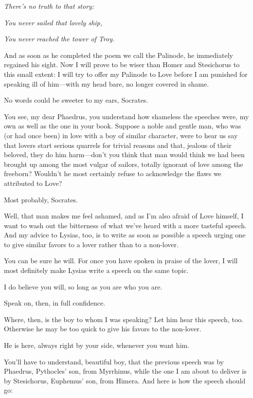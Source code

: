 {\em There's no truth to that story:}

{\em You never sailed that lovely ship,}

{\em You never reached the tower of
Troy.} \crlf
\crlf

And as soon as he completed the poem we call the Palinode, he
immediately regained his sight. Now I will prove to be wiser than Homer
and Stesichorus to this small extent: I will try to offer my Palinode to
Love before I am punished for speaking ill of him---with my head bare,
no longer covered in shame.

\sayphaedrus No words could be sweeter to my ears, Socrates.

\saysocrates You see, my dear Phaedrus, you understand how
shameless the speeches were, my own as well as the one in your book.
Suppose a noble and gentle man, who was (or had once been) in love with
a boy of similar character, were to hear us say that lovers start
serious quarrels for trivial reasons and that, jealous of their beloved,
they do him harm---don't you think that man would think we had been
brought up among the most vulgar of sailors, totally ignorant of
love among the freeborn? Wouldn't he most certainly refuse to
acknowledge the flaws we attributed to Love?

\sayphaedrus Most probably, Socrates.

\saysocrates Well, that man makes me feel ashamed, and as I'm also afraid
of Love himself, I want to wash out the bitterness of what we've heard
with a more tasteful speech. And my advice to Lysias, too, is to write
as soon as possible a speech urging one to give similar favors to a
lover rather than to a non-lover.

\sayphaedrus You can be sure he will. For once you have spoken in praise 
of the lover, I will most definitely make Lysias write a speech
on the same topic.

\saysocrates I do believe you will, so long as you are who you are.

\sayphaedrus Speak on, then, in full confidence.

\saysocrates Where, then, is the boy to whom I was speaking? Let him hear
this speech, too. Otherwise he may be too quick to give his favors to
the non-lover.

\sayphaedrus He is here, always right by your side, whenever you want him.

\saysocrates You'll have to understand, beautiful boy, that
the previous speech was by Phaedrus, Pythocles' son, from Myrrhinus,
while the one I am about to deliver is by Stesichorus, Euphemus' son,
from Himera. And here
is how the speech should go:


